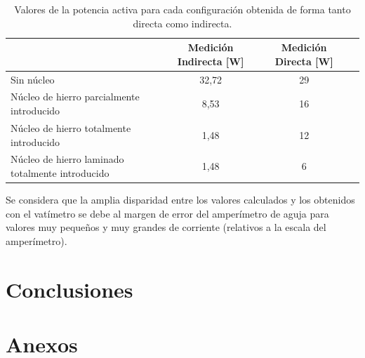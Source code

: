 \documentclass{article}
\begin{document}
            \begin{table}[h]
                \begin{tabular}{|p{5cm}|c|c|c|}
                \hline
                                                    & Medición Indirecta [W]   & Medición Directa [W] \\ \hline
                Sin núcleo                                        & 32,72                   & 29                        \\ \hline
                Núcleo de hierro parcialmente introducido            &       8,53        & 16                        \\ \hline
                Núcleo de hierro totalmente introducido             &      1,48          & 12                                 \\ \hline
                Núcleo de hierro laminado totalmente introducido   & 1,48               & 6              \\ \hline
                \end{tabular}
                \caption{Valores de la potencia activa para cada configuración obtenida de forma tanto directa como indirecta.}
                \label{tab:PotenciasActivas}
            \end{table}

            Se considera que la amplia disparidad entre los valores calculados y los obtenidos con el vatímetro se debe
            al margen de error del amperímetro de aguja para valores muy pequeños y muy grandes de corriente (relativos
            a la escala del amperímetro).

             
    \section{Conclusiones}

    \section{Anexos}
\end{document}
